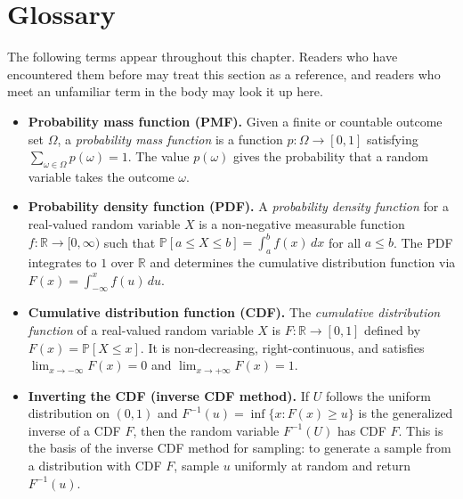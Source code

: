 \section{Glossary}\label{sec:glossary}\label{subsec:background}

The following terms appear throughout this chapter. Readers who have encountered them before may treat this section as a reference, and readers who meet an unfamiliar term in the body may look it up here.

\begin{itemize}

\item \textbf{Probability mass function (PMF).} Given a finite or countable outcome set $\Omega$, a \textit{probability mass function} is a function $p:\Omega\to[0,1]$ satisfying $\sum_{\omega\in\Omega} p(\omega)=1$. The value $p(\omega)$ gives the probability that a random variable takes the outcome $\omega$.

\item \textbf{Probability density function (PDF).} A \textit{probability density function} for a real-valued random variable $X$ is a non-negative measurable function $f:\mathbb{R}\to[0,\infty)$ such that $\mathbb{P}[a \leq X \leq b] = \int_a^b f(x)\,dx$ for all $a \leq b$. The PDF integrates to $1$ over $\mathbb{R}$ and determines the cumulative distribution function via $F(x) = \int_{-\infty}^x f(u)\,du$.

\item \textbf{Cumulative distribution function (CDF).} The \textit{cumulative distribution function} of a real-valued random variable $X$ is $F:\mathbb{R}\to[0,1]$ defined by $F(x)=\mathbb{P}[X\leq x]$. It is non-decreasing, right-continuous, and satisfies $\lim_{x\to-\infty}F(x)=0$ and $\lim_{x\to+\infty}F(x)=1$.

\item \textbf{Inverting the CDF (inverse CDF method).} If $U$ follows the uniform distribution on $(0,1)$ and $F^{-1}(u)=\inf\{x:F(x)\geq u\}$ is the generalized inverse of a CDF $F$, then the random variable $F^{-1}(U)$ has CDF $F$. This is the basis of the inverse CDF method for sampling: to generate a sample from a distribution with CDF $F$, sample $u$ uniformly at random and return $F^{-1}(u)$.


\end{itemize}
